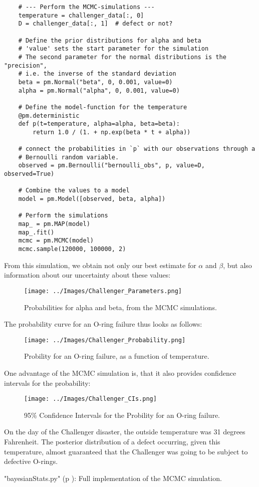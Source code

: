 \begin{lstlisting}
    # --- Perform the MCMC-simulations ---
    temperature = challenger_data[:, 0]
    D = challenger_data[:, 1]  # defect or not?

    # Define the prior distributions for alpha and beta
    # 'value' sets the start parameter for the simulation
    # The second parameter for the normal distributions is the "precision",
    # i.e. the inverse of the standard deviation
    beta = pm.Normal("beta", 0, 0.001, value=0)
    alpha = pm.Normal("alpha", 0, 0.001, value=0)

    # Define the model-function for the temperature
    @pm.deterministic
    def p(t=temperature, alpha=alpha, beta=beta):
        return 1.0 / (1. + np.exp(beta * t + alpha))

    # connect the probabilities in `p` with our observations through a
    # Bernoulli random variable.
    observed = pm.Bernoulli("bernoulli_obs", p, value=D, observed=True)

    # Combine the values to a model
    model = pm.Model([observed, beta, alpha])

    # Perform the simulations
    map_ = pm.MAP(model)
    map_.fit()
    mcmc = pm.MCMC(model)
    mcmc.sample(120000, 100000, 2)
\end{lstlisting}

From this simulation, we obtain not only our best estimate for $\alpha$ and $\beta$, but also information about our uncertainty about these values:

\begin{figure}[H]
  \centering
  \texttt{[image: ../Images/Challenger\_Parameters.png]}\\
  \caption{Probabilities for alpha and beta, from the MCMC simulations.}
\end{figure}

The probability curve for an O-ring failure thus looks as follows:

\begin{figure}[H]
  \centering
  \texttt{[image: ../Images/Challenger\_Probability.png]}\\
  \caption{Probility for an O-ring failure, as a function of temperature.}
\end{figure}

One advantage of the MCMC simulation is, that it also provides confidence intervals for the probability:

\begin{figure}[H]
  \centering
  \texttt{[image: ../Images/Challenger\_CIs.png]}\\
  \caption{95\% Confidence Intervals for the Probility for an O-ring failure.}
\end{figure}

On the day of the Challenger disaster, the outside temperature was 31 degrees Fahrenheit. The posterior distribution of a defect occurring, given this temperature, almost guaranteed that the Challenger was going to be subject to defective O-rings.

\PyImg "bayesianStats.py" (p \pageref{py:bayesianStats}): Full implementation of the MCMC simulation.

